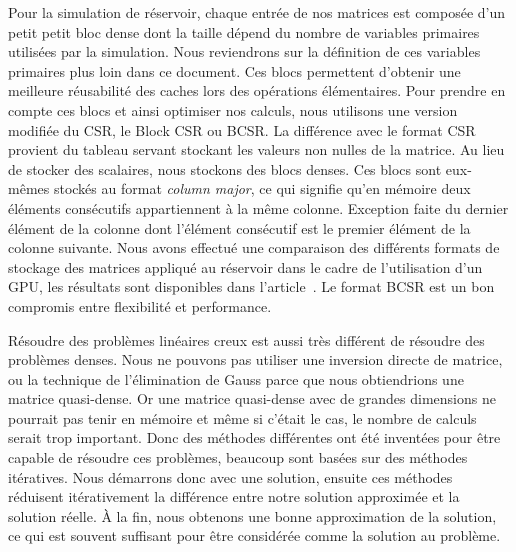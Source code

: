 Pour la simulation de réservoir, chaque entrée de nos matrices est composée d'un petit petit bloc dense dont la taille dépend du nombre de variables primaires utilisées par la simulation.
%
Nous reviendrons sur la définition de ces variables primaires plus loin dans ce document.
%
Ces blocs permettent d'obtenir une meilleure réusabilité des caches lors des opérations élémentaires.
%
Pour prendre en compte ces blocs et ainsi optimiser nos calculs, nous utilisons une version modifiée du CSR, le Block CSR ou BCSR.
%
La différence avec le format CSR provient du tableau servant stockant les valeurs non nulles de la matrice.
%
Au lieu de stocker des scalaires, nous stockons des blocs denses.
%
Ces blocs sont eux-mêmes stockés au format {\em column major}, ce qui signifie qu'en mémoire deux éléments consécutifs appartiennent à la même colonne.
%
Exception faite du dernier élément de la colonne dont l'élément consécutif est le premier élément de la colonne suivante.
%
Nous avons effectué une comparaison des différents formats de stockage des matrices appliqué au réservoir dans le cadre de l'utilisation d'un GPU, les résultats sont disponibles dans l'article~\cite{Renpar}.
%
Le format BCSR est un bon compromis entre flexibilité et performance.



Résoudre des problèmes linéaires creux est aussi très différent de résoudre des problèmes denses.
%
Nous ne pouvons pas utiliser une inversion directe de matrice, ou la technique de l'élimination de Gauss parce que nous obtiendrions une matrice quasi-dense.
%
Or une matrice quasi-dense avec de grandes dimensions ne pourrait pas tenir en mémoire et même si c'était le cas, le nombre de calculs serait trop important.
%
Donc des méthodes différentes ont été inventées pour être capable de résoudre ces problèmes, beaucoup sont basées sur des méthodes itératives.
%
Nous démarrons donc avec une solution, ensuite ces méthodes réduisent itérativement la différence entre notre solution approximée et la solution réelle.
%
\`{A} la fin, nous obtenons une bonne approximation de la solution, ce qui est souvent suffisant pour être considérée comme la solution au problème.
